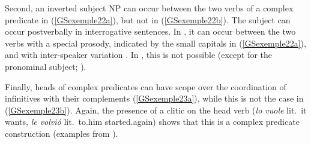 	\label{GSexemple21c}	
\zl

Second, an inverted subject NP can occur between the two verbs of a complex predicate in  (\ref{GSexemple22a}), but not in  (\ref{GSexemple22b}). The subject can occur postverbally in interrogative sentences. In , it can occur between the two verbs with a special prosody, indicated by the small capitals in (\ref{GSexemple22a}), and with inter-speaker variation \citep{salvi1980ausiliari}. In , this is not possible (except for the pronominal subject; \citealt{suner1982syntax}).

\eal
\judgewidth{\%}
	\label{GSexemple22} 
	\label{GSexemple22a}

	\label{GSexemple22b}		
	
	\label{GSexemple22c}	
\zl

Finally,  heads of complex predicates can have scope over the coordination of infinitives with their complements (\ref{GSexemple23a}), while this is not the case in  (\ref{GSexemple23b}). Again, the presence of a clitic on the head verb (\emph{lo vuole} lit.\ it wants, \emph{le volvi\'o} lit.\ to.him started.again) shows that this is a complex predicate construction (examples from \citealt[136--137]{AG2010}).

\eal
\judgewidth{\%}
\label{GSexemple23}%
\label{GSexemple23a}

